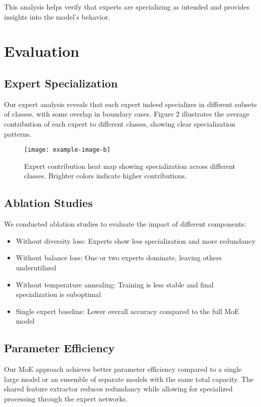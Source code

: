 \documentclass[conference]{IEEEtran}
\begin{document}
This analysis helps verify that experts are specializing as intended and provides insights into the model's behavior.

\section{Evaluation}
\subsection{Expert Specialization}
Our expert analysis reveals that each expert indeed specializes in different subsets of classes, with some overlap in boundary cases. Figure 2 illustrates the average contribution of each expert to different classes, showing clear specialization patterns.

\begin{figure}[!t]
\centering
\texttt{[image: example-image-b]}
\caption{Expert contribution heat map showing specialization across different classes. Brighter colors indicate higher contributions.}
\label{fig_expert_heatmap}
\end{figure}

\subsection{Ablation Studies}
We conducted ablation studies to evaluate the impact of different components:

\begin{itemize}
    \item Without diversity loss: Experts show less specialization and more redundancy
    \item Without balance loss: One or two experts dominate, leaving others underutilized
    \item Without temperature annealing: Training is less stable and final specialization is suboptimal
    \item Single expert baseline: Lower overall accuracy compared to the full MoE model
\end{itemize}

\subsection{Parameter Efficiency}
Our MoE approach achieves better parameter efficiency compared to a single large model or an ensemble of separate models with the same total capacity. The shared feature extractor reduces redundancy while allowing for specialized processing through the expert networks.
\end{document}
